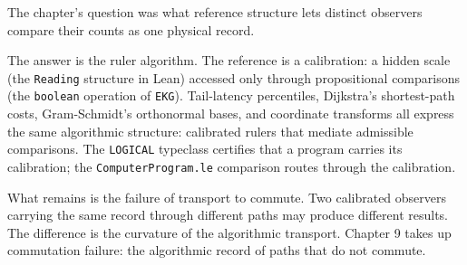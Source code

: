 \begin{bridge}

The chapter's question was what reference structure lets distinct
observers compare their counts as one physical record.

The answer is the ruler algorithm. The reference is a calibration:
a hidden scale (the \texttt{Reading} structure in Lean) accessed
only through propositional comparisons (the \texttt{boolean}
operation of \texttt{EKG}). Tail-latency percentiles, Dijkstra's
shortest-path costs, Gram-Schmidt's orthonormal bases, and
coordinate transforms all express the same algorithmic structure:
calibrated rulers that mediate admissible comparisons. The
\texttt{LOGICAL} typeclass certifies that a program carries its
calibration; the \texttt{ComputerProgram.le} comparison routes
through the calibration.

What remains is the failure of transport to commute. Two
calibrated observers carrying the same record through different
paths may produce different results. The difference is the
curvature of the algorithmic transport. Chapter 9 takes up
commutation failure: the algorithmic record of paths that do
not commute.

\end{bridge}

